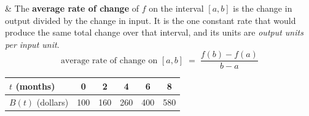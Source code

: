 \documentclass[10pt]{article}
\begin{document}
\small
\begin{guidednotes}
 &
The \textbf{average rate of change} of $f$ on the interval $[a, b]$ is the change in output
divided by the change in input. It is the one constant rate that would produce the same total
change over that interval, and its units are \emph{output units per input unit}.
\[ \text{average rate of change on } [a, b] \;=\; \frac{f(b) - f(a)}{b - a} \]
\vspace{-4pt}
\begin{center}
\renewcommand{\arraystretch}{1.3}
\begin{tabular}{|l|c|c|c|c|c|}
\hline
$t$ (months)          & 0   & 2   & 4   & 6   & 8   \\ \hline
$B(t)$ (dollars)      & 100 & 160 & 260 & 400 & 580 \\ \hline
\end{tabular}


\end{center}
\end{guidednotes}
\end{document}
